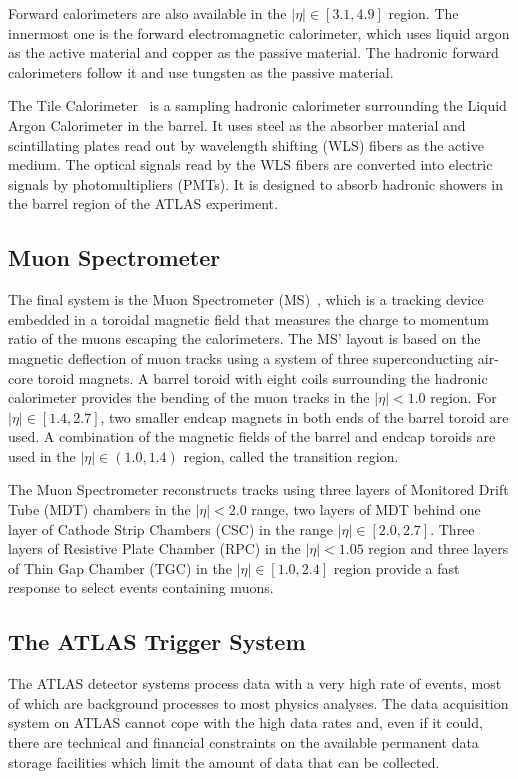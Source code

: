 Forward calorimeters are also available in the $|\eta| \in [3.1, 4.9]$ region. The innermost one is the forward
electromagnetic calorimeter, which uses liquid argon as the active material and copper as the passive material.
The hadronic forward calorimeters follow it and use tungsten as the passive material. 

The Tile Calorimeter~\cite{tiletdr} is a sampling hadronic calorimeter surrounding the Liquid Argon Calorimeter in
the barrel. It uses steel
as the absorber material and scintillating plates read out by wavelength
shifting (WLS) fibers as the active medium. The optical signals read by the WLS
fibers are converted into electric signals by photomultipliers (PMTs).
It is designed to absorb hadronic showers in the barrel region of the ATLAS
experiment.

\subsection{Muon Spectrometer}

The final system is the Muon Spectrometer (MS)~\cite{detpaper}, which is a tracking device
embedded in a toroidal magnetic field that measures the charge to
momentum ratio of
the muons escaping the calorimeters.
The MS' layout is based on the magnetic deflection of muon tracks using a system of three superconducting air-core toroid
magnets. A barrel toroid with eight coils surrounding the hadronic calorimeter provides the bending of the
muon tracks in the $|\eta| <1.0$ region. For $|\eta| \in [1.4, 2.7]$, two smaller endcap magnets in both ends of the barrel toroid are used.
A combination of the magnetic fields of the barrel and endcap toroids are used in the $|\eta| \in (1.0, 1.4)$ region, called the transition region.

The Muon Spectrometer reconstructs tracks using three layers of Monitored Drift Tube (MDT) chambers in the
$|\eta| < 2.0$ range, two layers of MDT behind one layer of Cathode Strip Chambers (CSC) in the range $|\eta| \in [2.0, 2.7]$.
Three layers of Resistive Plate Chamber (RPC) in the $|\eta| < 1.05$ region and three layers of Thin Gap Chamber (TGC) in the
$|\eta| \in [1.0, 2.4]$ region provide a fast response to select events containing muons.


\subsection{The ATLAS Trigger System}

The ATLAS detector systems process data with a very high rate of events,
most of which are background processes to most physics analyses.
The data acquisition system on ATLAS cannot cope with the
high data rates and, even if it could, there are technical and financial
constraints on the available permanent data storage facilities which limit the
amount of data that can be collected.

